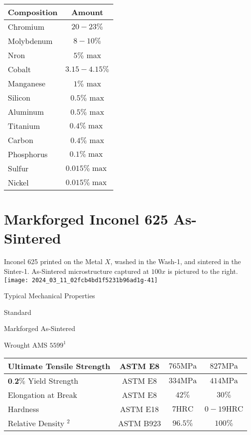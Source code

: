 \documentclass[10pt]{article}
\begin{document}
\begin{center}
\begin{tabular}{lc}
Composition & Amount \\
\hline
Chromium & $20-23 \%$ \\
\hline
Molybdenum & $8-10 \%$ \\
\hline
Nron & $5 \%$ max \\
\hline
Cobalt & $3.15-4.15 \%$ \\
\hline
Manganese & $1 \%$ max \\
\hline
Silicon & $0.5 \%$ max \\
\hline
Aluminum & $0.5 \%$ max \\
\hline
Titanium & $0.4 \% \max$ \\
\hline
Carbon & $0.4 \%$ max \\
\hline
Phosphorus & $0.1 \% \max$ \\
\hline
Sulfur & $0.015 \% \max$ \\
\hline
Nickel & $0.015 \% \max$ \\
\hline
\end{tabular}
\end{center}

\section*{Markforged Inconel 625 As-Sintered}
Inconel 625 printed on the Metal $X$, washed in the Wash-1, and sintered in the Sinter-1. As-Sintered microstructure captured at $100 x$ is pictured to the right.\\
\texttt{[image: 2024\_03\_11\_02fcb4bd1f5231b96ad1g-41]}

Typical Mechanical Properties

Standard

Markforged As-Sintered

Wrought AMS $5599^{1}$

\begin{center}
\begin{tabular}{lccc}
\hline
Ultimate Tensile Strength & ASTM E8 & $765 \mathrm{MPa}$ & $827 \mathrm{MPa}$ \\
\hline
$\mathbf{0 . 2 \%}$ Yield Strength & ASTM E8 & $334 \mathrm{MPa}$ & $414 \mathrm{MPa}$ \\
\hline
Elongation at Break & ASTM E8 & $42 \%$ & $30 \%$ \\
\hline
Hardness & ASTM E18 & $7 \mathrm{HRC}$ & $0-19 \mathrm{HRC}$ \\
\hline
Relative Density ${ }^{2}$ & ASTM B923 & $96.5 \%$ & $100 \%$ \\
\hline
\end{tabular}
\end{center}
\end{document}
